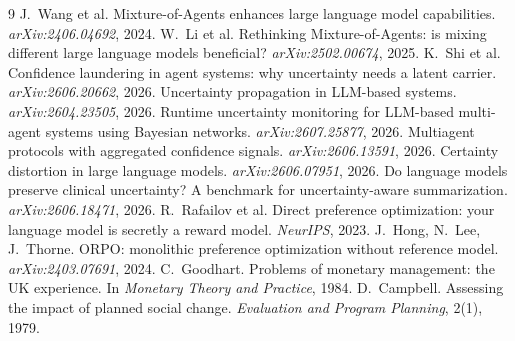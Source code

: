 \documentclass[11pt]{article}
\begin{document}
\begin{thebibliography}{9}
 J.~Wang et al. Mixture-of-Agents enhances large
language model capabilities. \emph{arXiv:2406.04692}, 2024.
 W.~Li et al. Rethinking Mixture-of-Agents: is
mixing different large language models beneficial?
\emph{arXiv:2502.00674}, 2025.
 K.~Shi et al. Confidence laundering in agent
systems: why uncertainty needs a latent carrier. \emph{arXiv:2606.20662},
2026.
 Uncertainty propagation in LLM-based systems.
\emph{arXiv:2604.23505}, 2026.
 Runtime uncertainty monitoring for LLM-based
multi-agent systems using Bayesian networks. \emph{arXiv:2607.25877}, 2026.
 Multiagent protocols with aggregated confidence
signals. \emph{arXiv:2606.13591}, 2026.
 Certainty distortion in large language models.
\emph{arXiv:2606.07951}, 2026.
 Do language models preserve clinical uncertainty? A
benchmark for uncertainty-aware summarization. \emph{arXiv:2606.18471},
2026.
 R.~Rafailov et al. Direct preference
optimization: your language model is secretly a reward model.
\emph{NeurIPS}, 2023.
 J.~Hong, N.~Lee, J.~Thorne. ORPO: monolithic
preference optimization without reference model. \emph{arXiv:2403.07691},
2024.
 C.~Goodhart. Problems of monetary management: the
UK experience. In \emph{Monetary Theory and Practice}, 1984.
 D.~Campbell. Assessing the impact of planned social
change. \emph{Evaluation and Program Planning}, 2(1), 1979.
\end{thebibliography}
\end{document}

